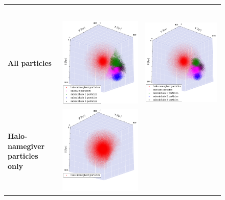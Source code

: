 \begin{subfigures}

	\begin{figure}[!htbp]
		{
			\renewcommand{\arraystretch}{0.1}
			\centering	
			\begin{tabular}{|p{.5cm} c c|}
				\hline
				&&\\[1em]
				&	\phewon\ 	& \simple \\[1.5em]
				\begin{sideways}{\hspace{3cm} \textbf{All particles}}\end{sideways} \hspace*{-1em}	&		 
				{\includegraphics[width = .42\textwidth]{images/dice-sub/dice-sub-plot-halo1-phew.png}} \hspace*{-1em} 	& 
				{\includegraphics[width = .42\textwidth]{images/dice-sub/dice-sub-plot-halo1-nosaddle.png}} \hspace*{-1em}	\\
				\begin{sideways}{ \hspace{.5cm}\textbf{Halo-namegiver particles only} }\end{sideways}	 \hspace*{-1em}			 &			 
				{\includegraphics[width = .42\textwidth]{images/dice-sub/dice-sub-halo-only-phew.png}} \hspace*{-1em} 		&

\end{tabular}}
\end{figure}
\end{subfigures}
